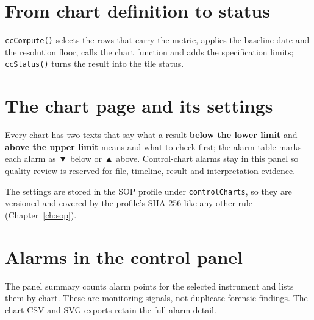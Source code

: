 \section{From chart definition to status}
\texttt{ccCompute()} selects the rows that carry the metric, applies the baseline date and the resolution floor, calls the
chart function and adds the specification limits; \texttt{ccStatus()} turns the result into the tile status.








\section{The chart page and its settings}

Every chart has two texts that say what a result \textbf{below the lower limit} and \textbf{above the upper limit} means and
what to check first; the alarm table marks each alarm as ▼ below or ▲ above. Control-chart alarms stay in this panel so
quality review is reserved for file, timeline, result and interpretation evidence.




The settings are stored in the SOP profile under \texttt{controlCharts}, so they are versioned and covered by the profile's
SHA-256 like any other rule (Chapter~\ref{ch:sop}).





\section{Alarms in the control panel}
The panel summary counts alarm points for the selected instrument and lists them by chart. These are monitoring signals,
not duplicate forensic findings. The chart CSV and SVG exports retain the full alarm detail.


